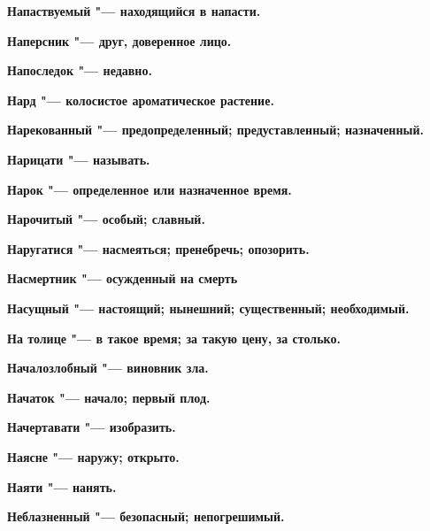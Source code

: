 \begin{multicols}{2}
\bfseries Напаствуемый\normalfont{} "--- находящийся в напасти. 




\bfseries Наперсник\normalfont{} "--- друг, доверенное лицо. 




\bfseries Напоследок\normalfont{} "--- недавно. 




\bfseries Нард\normalfont{} "--- колосистое ароматическое растение. 




\bfseries Нарекованный\normalfont{} "--- предопределенный; предуставленный; назначенный. 




\bfseries Нарицати\normalfont{} "--- называть. 




\bfseries Нарок\normalfont{} "--- определенное или назначенное время. 




\bfseries Нарочитый\normalfont{} "--- особый; славный. 




\bfseries Наругатися\normalfont{} "--- насмеяться; пренебречь; опозорить. 




\bfseries Насмертник\normalfont{} "--- осужденный на смерть 




\bfseries Насущный\normalfont{} "--- настоящий; нынешний; существенный; необходимый. 




\bfseries На толице\normalfont{} "--- в такое время; за такую цену, за столько. 




\bfseries Началозлобный\normalfont{} "--- виновник зла. 




\bfseries Начаток\normalfont{} "--- начало; первый плод. 




\bfseries Начертавати\normalfont{} "--- изобразить. 




\bfseries Наясне\normalfont{} "--- наружу; открыто. 




\bfseries Наяти\normalfont{} "--- нанять. 




\bfseries Неблазненный\normalfont{} "--- безопасный; непогрешимый. 





\end{multicols}
